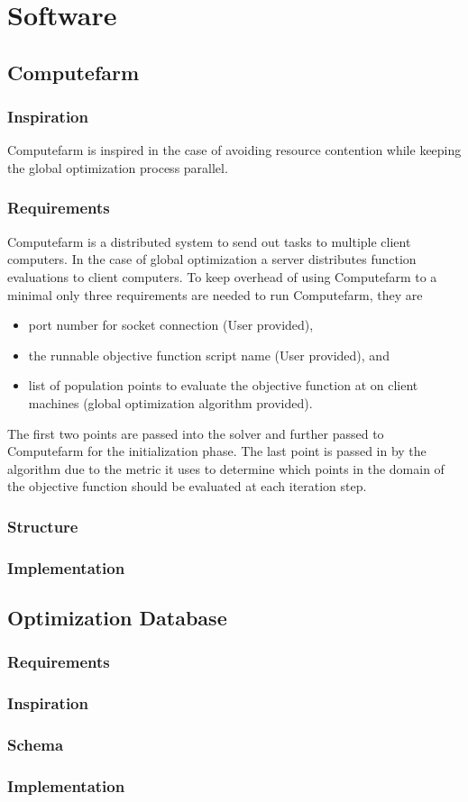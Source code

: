 \chapter{Software}
\section{Computefarm}

\subsection{Inspiration}
Computefarm is inspired in the case of avoiding resource contention while keeping the global optimization process parallel.  

\subsection{Requirements}
Computefarm is a distributed system to send out tasks to multiple client computers. In the case of global optimization a server distributes function evaluations to client computers. To keep overhead of using Computefarm to a minimal only three requirements are needed to run Computefarm, they are
\begin{itemize}
    \item port number for socket connection (User provided),
    \item the runnable objective function script name (User provided), and
    \item list of population points to evaluate the objective function at on client machines (global optimization algorithm provided).
\end{itemize}

The first two points are passed into the solver and further passed to Computefarm for the initialization phase. The last point is passed in by the algorithm due to the metric it uses to determine which points in the domain of the objective function should be evaluated at each iteration step. 
 
\subsection{Structure}
\subsection{Implementation}

\section{Optimization Database}
\subsection{Requirements}
\subsection{Inspiration}
\subsection{Schema}
\subsection{Implementation}
